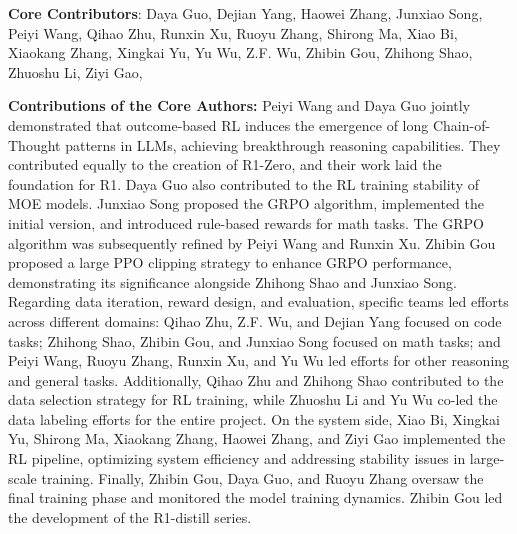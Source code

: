 \textbf{Core Contributors}: Daya Guo, Dejian Yang, Haowei Zhang, Junxiao Song, Peiyi Wang, Qihao Zhu, Runxin Xu, Ruoyu Zhang, Shirong Ma, Xiao Bi, Xiaokang Zhang, Xingkai Yu, Yu Wu, Z.F. Wu, Zhibin Gou, Zhihong Shao, Zhuoshu Li, Ziyi Gao,

\textbf{Contributions of the Core Authors: } Peiyi Wang and Daya Guo jointly demonstrated that outcome-based RL induces the emergence of long Chain-of-Thought patterns in LLMs, achieving breakthrough reasoning capabilities. They contributed equally to the creation of R1-Zero, and their work laid the foundation for R1. Daya Guo also contributed to the RL training stability of MOE models. Junxiao Song proposed the GRPO algorithm, implemented the initial version, and introduced rule-based rewards for math tasks. The GRPO algorithm was subsequently refined by Peiyi Wang and Runxin Xu. Zhibin Gou proposed a large PPO clipping strategy to enhance GRPO performance,  demonstrating its significance alongside Zhihong Shao and Junxiao Song. Regarding data iteration, reward design, and evaluation, specific teams led efforts across different domains: Qihao Zhu, Z.F. Wu, and Dejian Yang focused on code tasks; Zhihong Shao, Zhibin Gou, and Junxiao Song focused on math tasks; and Peiyi Wang, Ruoyu Zhang, Runxin Xu, and Yu Wu led efforts for other reasoning and general tasks. Additionally, Qihao Zhu and Zhihong Shao contributed to the data selection strategy for RL training, while Zhuoshu Li and Yu Wu co-led the data labeling efforts for the entire project. On the system side, Xiao Bi, Xingkai Yu, Shirong Ma, Xiaokang Zhang, Haowei Zhang, and Ziyi Gao implemented the RL pipeline, optimizing system efficiency and addressing stability issues in large-scale training. Finally, Zhibin Gou, Daya Guo, and Ruoyu Zhang oversaw the final training phase and monitored the model training dynamics. Zhibin Gou led the development of the R1-distill series.

